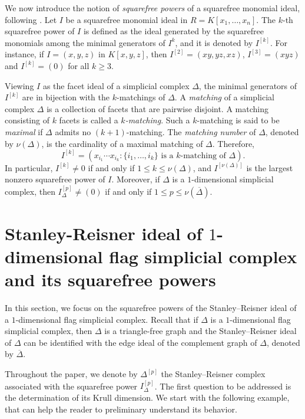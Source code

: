\documentclass[12pt]{amsart}
\begin{document}
We now introduce the notion of \textit{squarefree powers} of a squarefree monomial ideal, following \cite{BHZ}. Let $I$ be a squarefree monomial ideal in $R = K[x_1, \ldots, x_n]$. The $k$-th squarefree power of $I$ is defined as the ideal generated by the squarefree monomials among the minimal generators of $I^k$, and it is denoted by $I^{[k]}$. For instance, if $I=(x,y,z)$ in $K[x,y,z]$, then $I^{[2]}=(xy,yz,xz)$, $I^{[3]}=(xyz)$ and $I^{[k]}=(0)$ for all $k\geq 3$. 

Viewing $I$ as the facet ideal of a simplicial complex $\Delta$, the minimal generators of $I^{[k]}$ are in bijection with the $k$-matchings of $\Delta$.
A \emph{matching} of a simplicial complex $\Delta$ is a collection of facets that are pairwise disjoint. A matching consisting of $k$ facets is called a \textit{$k$-matching}. Such a $k$-matching is said to be \emph{maximal} if $\Delta$ admits no $(k+1)$-matching. The \emph{matching number} of $\Delta$, denoted by $\nu(\Delta)$, is the cardinality of a maximal matching of $\Delta$. Therefore,
\[
I^{[k]} = (x_{i_1}\cdots x_{i_k} : \{i_1, \ldots, i_k\} \text{ is a $k$-matching of } \Delta).
\]
In particular, $I^{[k]} \neq 0$ if and only if $1 \le k \le \nu(\Delta)$, and $I^{[\nu(\Delta)]}$ is the largest nonzero squarefree power of $I$. Moreover, if $\Delta$ is a $1$-dimensional simplicial complex, then $I_{\Delta}^{[p]} \neq (0)$ if and only if $1 \le p \le \nu(\overline{\Delta})$.



\section{Stanley-Reisner ideal of $1$-dimensional flag simplicial complex and its squarefree powers}\label{sec: 1-dim flag simplicial complexes}

In this section, we focus on the squarefree powers of the Stanley--Reisner ideal of a $1$-dimensional flag simplicial complex. Recall that if $\Delta$ is a $1$-dimensional flag simplicial complex, then $\Delta$ is a triangle-free graph and the Stanley--Reisner ideal of $\Delta$ can be identified with the edge ideal of the complement graph of $\Delta$, denoted by $\overline{\Delta}$.

Throughout the paper, we denote by $\Delta^{[p]}$ the Stanley--Reisner complex associated with the squarefree power $I_{\Delta}^{[p]}$. The first question to be addressed is the determination of its Krull dimension. We start with the following example, that can help the reader to preliminary understand its behavior. 
\end{document}
